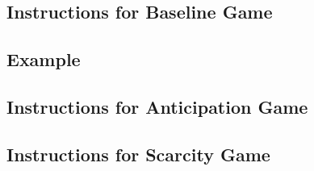 \documentclass[11pt, a4paper, leqno]{article}
\begin{document}
        \subsection{Instructions for Baseline Game}
        

        \subsection{Example}
        

        \subsection{Instructions for Anticipation Game}
        

        \subsection{Instructions for Scarcity Game}
        
\end{document}
